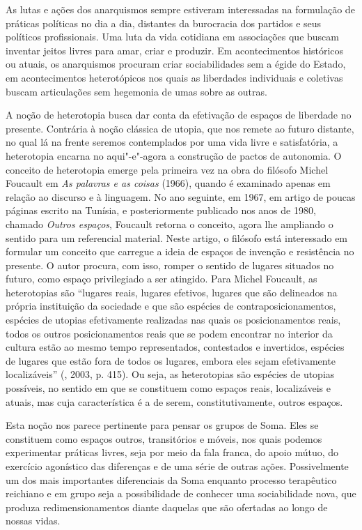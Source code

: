 As lutas e ações dos anarquismos sempre estiveram interessadas na
formulação de práticas políticas no dia a dia, distantes da burocracia
dos partidos e seus políticos profissionais. Uma luta da vida cotidiana
em associações que buscam inventar jeitos livres para amar, criar e
produzir. Em acontecimentos históricos ou atuais, os anarquismos
procuram criar sociabilidades sem a égide do Estado, em acontecimentos
heterotópicos nos quais as liberdades individuais e coletivas buscam
articulações sem hegemonia de umas sobre as outras.

A noção de heterotopia busca dar conta da efetivação de espaços de
liberdade no presente. Contrária à noção clássica de utopia, que nos
remete ao futuro distante, no qual lá na frente seremos contemplados por
uma vida livre e satisfatória, a heterotopia encarna no aqui"-e"-agora
a construção de pactos de autonomia. O conceito de heterotopia emerge
pela primeira vez na obra do filósofo Michel Foucault em \emph{As
palavras e as coisas} (1966), quando é examinado apenas em relação ao
discurso e à linguagem. No ano seguinte, em 1967, em artigo de poucas
páginas escrito na Tunísia, e posteriormente publicado nos anos de 1980,
chamado \emph{Outros espaços}, Foucault retorna o conceito, agora lhe
ampliando o sentido para um referencial material. Neste artigo, o
filósofo está interessado em formular um conceito que carregue a ideia
de espaços de invenção e resistência no presente. O autor procura, com
isso, romper o sentido de lugares situados no futuro, como espaço
privilegiado a ser atingido. Para Michel Foucault, as heterotopias são
``lugares reais, lugares efetivos, lugares que são delineados na própria
instituição da sociedade e que são espécies de contraposicionamentos,
espécies de utopias efetivamente realizadas nas quais os posicionamentos
reais, todos os outros posicionamentos reais que se podem encontrar no
interior da cultura estão ao mesmo tempo representados, contestados e
invertidos, espécies de lugares que estão fora de todos os lugares,
embora eles sejam efetivamente localizáveis'' (, 2003, p. 415).
Ou seja, as heterotopias são espécies de utopias possíveis, no sentido
em que se constituem como espaços reais, localizáveis e atuais, mas cuja
característica é a de serem, constitutivamente, outros espaços.

Esta noção nos parece pertinente para pensar os grupos de Soma. Eles se
constituem como espaços outros, transitórios e móveis, nos quais podemos
experimentar práticas livres, seja por meio da fala franca, do apoio
mútuo, do exercício agonístico das diferenças e de uma série de outras
ações. Possivelmente um dos mais importantes diferenciais da Soma
enquanto processo terapêutico reichiano e em grupo seja a possibilidade
de conhecer uma sociabilidade nova, que produza redimensionamentos
diante daquelas que são ofertadas ao longo de nossas vidas.


